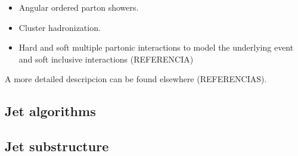 \begin{itemize}\addtolength{\itemsep}{-0.4\baselineskip}
\item
Angular ordered parton showers.
\item
Cluster hadronization.

\item 
Hard and soft multiple partonic interactions to model the underlying event and soft inclusive interactions (REFERENCIA) %
\end{itemize}


A more detailed descripcion can be found elsewhere (REFERENCIAS).

\subsection{Jet algorithms}

\subsection{Jet substructure}
